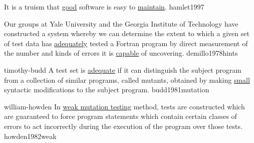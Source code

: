 \documentclass{article}
\begin{document}

  {It is a truism that \ul{good} software is easy to \ul{maintain}.}
  {hamlet1997}


  {Our groups at Yale University and the Georgia Institute of Technology have constructed a system whereby we can determine the extent to which a given set of test data has \ul{adequately} tested a Fortran program by direct measurement of the number and kinds of errors it is \ul{capable} of uncovering.}
  {demillo1978hints}

\lnQuote
  {timothy-budd}
  {A test set is \ul{adequate} if it can distinguish the subject program from a collection of similar programs, called mutants, obtained by making \ul{small} syntactic modifications to the subject program.}
  {budd1981mutation}

\lnQuote
  {william-howden}
  {In \ul{weak mutation testing} method, tests are constructed which are guaranteed to force program statements which contain certain classes of errors to act incorrectly during the execution of the program over those tests.}
  {howden1982weak}
\end{document}
